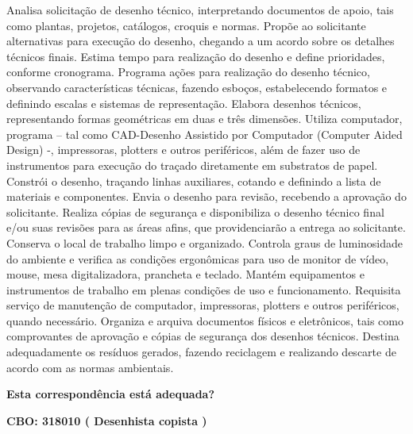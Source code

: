 \documentclass[
]{article}
\begin{document}
Analisa solicitação de desenho técnico, interpretando documentos de
apoio, tais como plantas, projetos, catálogos, croquis e normas. Propõe
ao solicitante alternativas para execução do desenho, chegando a um
acordo sobre os detalhes técnicos finais. Estima tempo para realização
do desenho e define prioridades, conforme cronograma. Programa ações
para realização do desenho técnico, observando características técnicas,
fazendo esboços, estabelecendo formatos e definindo escalas e sistemas
de representação. Elabora desenhos técnicos, representando formas
geométricas em duas e três dimensões. Utiliza computador, programa --
tal como CAD-Desenho Assistido por Computador (Computer Aided Design) -,
impressoras, plotters e outros periféricos, além de fazer uso de
instrumentos para execução do traçado diretamente em substratos de
papel. Constrói o desenho, traçando linhas auxiliares, cotando e
definindo a lista de materiais e componentes. Envia o desenho para
revisão, recebendo a aprovação do solicitante. Realiza cópias de
segurança e disponibiliza o desenho técnico final e/ou suas revisões
para as áreas afins, que providenciarão a entrega ao solicitante.
Conserva o local de trabalho limpo e organizado. Controla graus de
luminosidade do ambiente e verifica as condições ergonômicas para uso de
monitor de vídeo, mouse, mesa digitalizadora, prancheta e teclado.
Mantém equipamentos e instrumentos de trabalho em plenas condições de
uso e funcionamento. Requisita serviço de manutenção de computador,
impressoras, plotters e outros periféricos, quando necessário. Organiza
e arquiva documentos físicos e eletrônicos, tais como comprovantes de
aprovação e cópias de segurança dos desenhos técnicos. Destina
adequadamente os resíduos gerados, fazendo reciclagem e realizando
descarte de acordo com as normas ambientais.

\begin{Form}
\textbf{Esta correspondência está adequada?} \\ 
\end{Form}

\textbf{CBO: 318010  ( Desenhista copista )}
\end{document}
